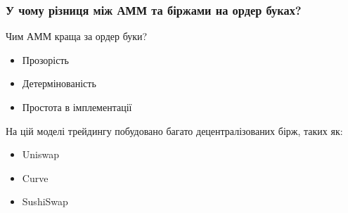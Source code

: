 \documentclass[beamer]{standalone}
\begin{document}
\begin{frame}\frametitle{У чому різниця між АММ та біржами на ордер буках?}
  \begin{block}{Чим АММ краща за ордер буки?}
    \begin{itemize}
      \item Прозорість
      \item Детермінованість
      \item Простота в імплементації
    \end{itemize}
  \end{block}

  На цій моделі трейдингу побудовано багато децентралізованих бірж, таких як:

  \begin{itemize}
    \item Uniswap
    \item Curve
    \item SushiSwap
  \end{itemize}
\end{frame}
\end{document}
